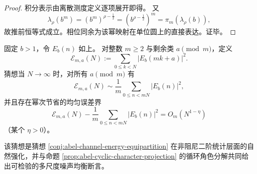 \begin{proof}
积分表示由离散测度定义逐项展开即得。
又
\[
\lambda_\rho(b^m)=(b^m)^{\rho-\frac12}
=(b^{\rho-\frac12})^m=\pi_m(\lambda_\rho(b)),
\]
故推前恒等式成立。相位同余为该幂映射在单位圆上的直接表达。证毕。
\end{proof}

\begin{conjecture}[模同余能量均分律]\label{conj:abel-congruence-energy-equipartition}
固定 \(b>1\)，令 \(E_b(n)\) 如上。
对整数 \(m\ge 2\) 与剩余类 \(a\pmod m\)，定义
\[
\mathcal E_{m,a}(N):=\sum_{0\le k<N}|E_b(mk+a)|^2.
\]
猜想当 \(N\to\infty\) 时，对所有 \(a\pmod m\) 有
\[
\mathcal E_{m,a}(N)\sim
\frac1m\sum_{0\le n<mN}|E_b(n)|^2,
\]
并且存在幂次节省的均匀误差界
\[
\mathcal E_{m,a}(N)-\frac1m\sum_{0\le n<mN}|E_b(n)|^2
=O_m(N^{1-\eta})
\]
（某个 \(\eta>0\)）。
\par
该猜想是猜想 \ref{conj:abel-channel-energy-equipartition} 在非阻尼二阶统计层面的自然强化，并与命题 \ref{prop:abel-cyclic-character-projection} 的循环角色分解共同给出可检验的多尺度噪声均衡断言。
\end{conjecture}

\endinput
